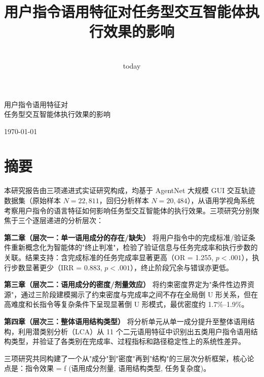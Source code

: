 \documentclass[12pt,a4paper,openany,oneside]{ctexrep}
\title{用户指令语用特征对任务型交互智能体执行效果的影响}
\author{}
\date{\\today}
\begin{document}

\begin{titlepage}
\thispagestyle{empty}

\begin{center}

\vspace*{4cm}

{\heiti 用户指令语用特征对\\[6pt]
任务型交互智能体执行效果的影响}

\vspace{20pt}


\vspace{40pt}

{}
\vfill

{\today}

\end{center}

\end{titlepage}


\newpage




\section{摘要}


本研究报告由三项递进式实证研究构成，均基于 AgentNet 大规模 GUI 交互轨迹数据集（原始样本 $N=22{,}811$，回归分析样本 $N=20{,}484$），从语用学视角系统考察用户指令的语言特征如何影响任务型交互智能体的执行效果。三项研究分别聚焦于三个逐层递进的分析层次：

\textbf{第二章（层次一：单一语用成分的存在/缺失）} 将用户指令中的完成标准/验证条件重新概念化为智能体的"终止判准"，检验了验证信息与任务完成率和执行步数的关联。结果支持：含完成标准的任务完成率显著更高（OR = 1.255, $p<.001$），执行步数显著更少（IRR = 0.883, $p<.001$），终止阶段冗余与错误亦更低。

\textbf{第三章（层次二：语用成分的密度/剂量效应）} 将约束密度界定为"条件性边界资源"，通过三阶段建模揭示了约束密度与完成率之间不存在全局倒 U 形关系，但在高难度和长指令等复杂条件下呈现显著倒 U 形模式，最优密度约 1.7\%–1.9\%。

\textbf{第四章（层次三：整体语用结构类型）} 将分析单元从单一成分提升至整体语用结构，利用潜类别分析（LCA）从 11 个二元语用特征中识别出五类用户指令语用结构类型，并验证了各类别在完成率、过程指标和路径稳定性上的系统性差异。

三项研究共同构建了一个从"成分"到"密度"再到"结构"的三层次分析框架，核心论点是：指令效果 = f (语用成分剂量, 语用结构类型, 任务复杂度)。
\end{document}
